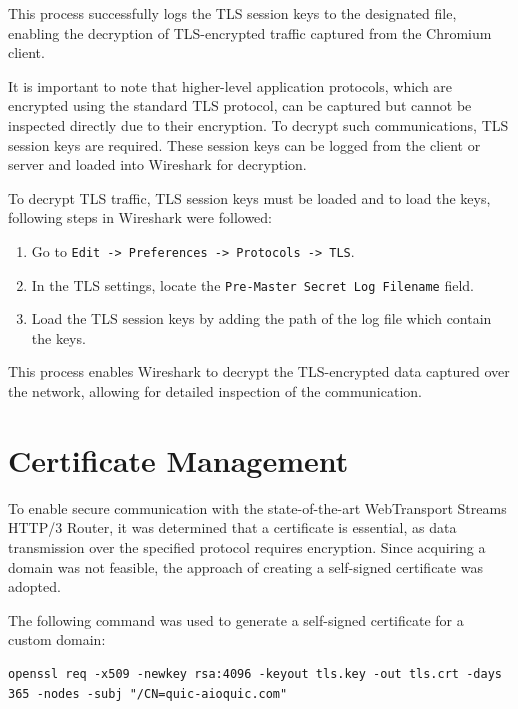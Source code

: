 This process successfully logs the TLS session keys to the designated file, enabling the decryption of TLS-encrypted traffic captured from the Chromium client.

It is important to note that higher-level application protocols, which are encrypted using the standard TLS protocol, can be captured but cannot be inspected directly due to their encryption. To decrypt such communications, TLS session keys are required. These session keys can be logged from the client or server and loaded into Wireshark for decryption.

To decrypt TLS traffic, TLS session keys must be loaded and to load the keys, following steps in Wireshark were followed:

\begin{enumerate}
    \item Go to \texttt{Edit -> Preferences -> Protocols -> TLS}.
    \item In the TLS settings, locate the \texttt{Pre-Master Secret Log Filename} field.
    \item Load the TLS session keys by adding the path of the log file which contain the keys.
\end{enumerate}

This process enables Wireshark to decrypt the TLS-encrypted data captured over the network, allowing for detailed inspection of the communication.




\section{Certificate Management}
To enable secure communication with the state-of-the-art WebTransport Streams HTTP/3 Router, it was determined that a certificate is essential, as data transmission over the specified protocol requires encryption. Since acquiring a domain was not feasible, the approach of creating a self-signed certificate was adopted.

The following command was used to generate a self-signed certificate for a custom domain:

\begin{lstlisting}[breaklines=true,basicstyle=\small\ttfamily,frame=single]
openssl req -x509 -newkey rsa:4096 -keyout tls.key -out tls.crt -days 365 -nodes -subj "/CN=quic-aioquic.com"
\end{lstlisting}

